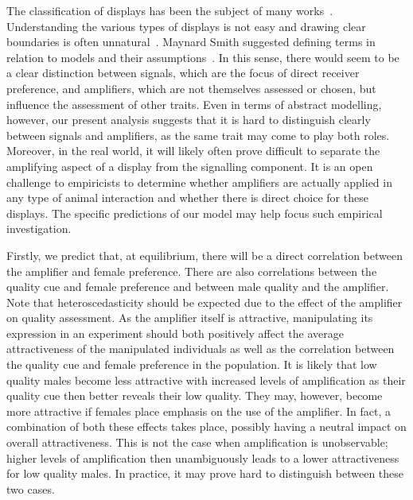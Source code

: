 \documentclass[a4paper,12pt]{article}
\numberwithin{equation}{section}
\numberwithin{figure}{section}
\begin{document}
The classification of displays has been the subject of many works~\cite{Hasson1994,MaynardSmith1995,MaynardSmith2003,Gualla2008}. Understanding the various types of displays is not easy and drawing clear boundaries is often unnatural~\cite{Gualla2008}. Maynard Smith suggested defining terms in relation to models and their assumptions~\cite{MaynardSmith1995}. In this sense, there would seem to be a clear distinction between signals, which are the focus of direct receiver preference, and amplifiers, which are not themselves assessed or chosen, but influence the assessment of other traits. Even in terms of abstract modelling, however, our present analysis suggests that it is hard to distinguish clearly between signals and amplifiers, as the same trait may come to play both roles. Moreover, in the real world, it will likely often prove difficult to separate the amplifying aspect of a display from the signalling component. It is an open challenge to empiricists to determine whether amplifiers are actually applied in any type of animal interaction and whether there is direct choice for these displays. The specific predictions of our model may help focus such empirical investigation.

Firstly, we predict that, at equilibrium, there will be a direct correlation between the amplifier and female preference. There are also correlations between the quality cue and female preference and between male quality and the amplifier. Note that heteroscedasticity should be expected due to the effect of the amplifier on quality assessment. As the amplifier itself is attractive, manipulating its expression in an experiment should both positively affect the average attractiveness of the manipulated individuals as well as the correlation between the quality cue and female preference in the population. It is likely that low quality males become less attractive with increased levels of amplification as their quality cue then better reveals their low quality. They may, however, become more attractive if females place emphasis on the use of the amplifier. In fact, a combination of both these effects takes place, possibly having a neutral impact on overall attractiveness. This is not the case when amplification is unobservable; higher levels of amplification then unambiguously leads to a lower attractiveness for low quality males. In practice, it may prove hard to distinguish between these two cases.
\end{document}
